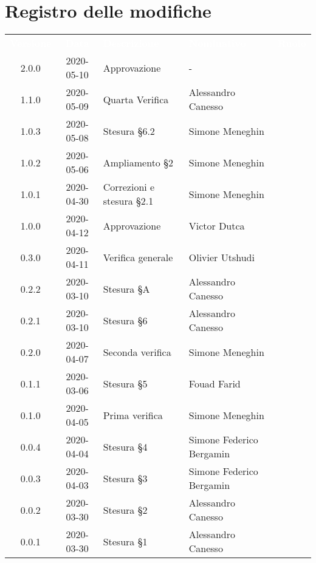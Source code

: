 \section*{Registro delle modifiche}
{
	\centering
	\begin{longtable}{ c c  C{4cm}  C{4cm}  C{3cm} }
		\textcolor{white}{\textbf{Versione}} & \textcolor{white}{\textbf{Data}} & \textcolor{white}{\textbf{Descrizione}} & \textcolor{white}{\textbf{Nominativo}} & \textcolor{white}{\textbf{Ruolo}}\\		
		2.0.0 & 2020-05-10 & Approvazione & - &\RdP{} \\
		1.1.0 & 2020-05-09 & Quarta Verifica & Alessandro Canesso &\ver{} \\
		1.0.3 & 2020-05-08 & Stesura \S 6.2 & Simone Meneghin &\adm{} \\
		1.0.2 & 2020-05-06 & Ampliamento \S 2 & Simone Meneghin &\adm{} \\
		1.0.1 & 2020-04-30 & Correzioni e stesura \S 2.1 & Simone Meneghin &\Res{} \\
		1.0.0 & 2020-04-12 & Approvazione & Victor Dutca &\RdP{} \\
		0.3.0 & 2020-04-11 & Verifica generale & Olivier Utshudi &\ver{} \\
		0.2.2 & 2020-03-10 & Stesura \S A & Alessandro Canesso &\Res{} \\
		0.2.1 & 2020-03-10 & Stesura \S 6 & Alessandro Canesso &\Res{} \\
		0.2.0 & 2020-04-07 & Seconda verifica & Simone Meneghin &\ver{} \\
		0.1.1 & 2020-03-06 & Stesura \S 5  & Fouad Farid &\Res{} \\
		0.1.0 & 2020-04-05 & Prima verifica & Simone Meneghin &\ver{} \\
		0.0.4 & 2020-04-04 & Stesura \S 4  & Simone Federico Bergamin &\adm{}\\	
		0.0.3 & 2020-04-03 & Stesura \S 3  & Simone Federico Bergamin &\adm{}\\	
		0.0.2 & 2020-03-30 & Stesura \S 2  & Alessandro Canesso &\Res{}\\	
		0.0.1 & 2020-03-30 & Stesura \S 1  & Alessandro Canesso &\Res{}\\		
	\end{longtable}
} 
